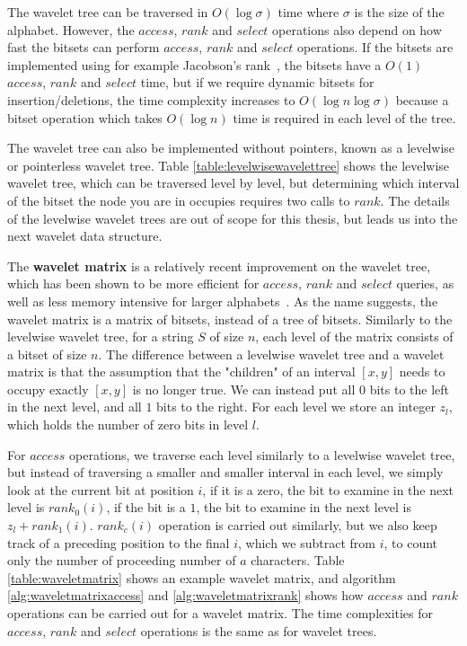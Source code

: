 The wavelet tree can be traversed in $O(\log \sigma)$ time where $\sigma$ is the size of
the alphabet. However, the $access$, $rank$ and $select$ operations also depend on how
fast the bitsets can perform $access$, $rank$ and $select$ operations. If the bitsets are
implemented using for example Jacobson's rank~\cite{JacobsonsRank}, the bitsets have a
$O(1)$ $access$, $rank$ and $select$ time, but if we require dynamic bitsets for
insertion/deletions, the time complexity increases to $O(\log n \log \sigma)$ because a
bitset operation which takes $O(\log n)$ time is required in each level of the tree.

The wavelet tree can also be implemented without pointers, known as a levelwise or
pointerless wavelet tree\cite{LevelwiseWaveletTree}. Table \ref{table:levelwisewavelettree}
shows the levelwise wavelet tree, which can be traversed level by level, but determining
which interval of the bitset the node you are in occupies requires two calls to $rank$.
The details of the levelwise wavelet trees are out of scope for this thesis, but leads us
into the next wavelet data structure.

The \textbf{wavelet matrix} is a relatively recent improvement on the wavelet tree, which
has been shown to be more efficient for $access$, $rank$ and $select$ queries, as well as
less memory intensive for larger alphabets~\cite{WaveletMatrix}. As the name suggests, the
wavelet matrix is a matrix of bitsets, instead of a tree of bitsets. Similarly to the
levelwise wavelet tree, for a string $S$ of size $n$, each level of the matrix consists of
a bitset of size $n$. The difference between a levelwise wavelet tree and a wavelet matrix
is that the assumption that the "children" of an interval $[x, y]$ needs to occupy exactly
$[x, y]$ is no longer true. We can instead put all $0$ bits to the left in the next level,
and all $1$ bits to the right. For each level we store an integer $z_l$, which holds the
number of zero bits in level $l$. 

For $access$ operations, we traverse each level similarly to a levelwise wavelet tree, but
instead of traversing a smaller and smaller interval in each level, we simply look at the
current bit at position $i$, if it is a zero, the bit to examine in the next level is
$rank_0(i)$, if the bit is a $1$, the bit to examine in the next level is $z_l +
rank_1(i)$. $rank_c(i)$ operation is carried out similarly, but we also keep track of a
preceding position to the final $i$, which we subtract from $i$, to count only the number
of proceeding number of $a$ characters. Table \ref{table:waveletmatrix} shows an example
wavelet matrix, and algorithm \ref{alg:waveletmatrixaccess} and
\ref{alg:waveletmatrixrank} shows how $access$ and $rank$ operations can be carried out
for a wavelet matrix. The time complexities for $access$, $rank$ and $select$ operations
is the same as for wavelet trees.

